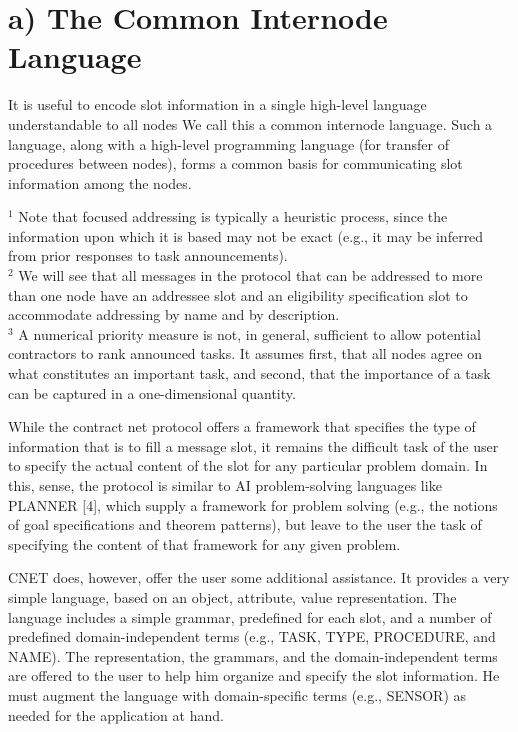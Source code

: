 \documentclass[
]{article}
\begin{document}
\section{a) The Common Internode
Language}\label{a-the-common-internode-language}

It is useful to encode slot information in a single high-level language
understandable to all nodes We call this a common internode language.
Such a language, along with a high-level programming language (for
transfer of procedures between nodes), forms a common basis for
communicating slot information among the nodes.

\(^{1}\) Note that focused addressing is typically a heuristic process,
since the information upon which it is based may not be exact (e.g., it
may be inferred from prior responses to task announcements).\\
\(^{2}\) We will see that all messages in the protocol that can be
addressed to more than one node have an addressee slot and an
eligibility specification slot to accommodate addressing by name and by
description.\\
\(^{3}\) A numerical priority measure is not, in general, sufficient to
allow potential contractors to rank announced tasks. It assumes first,
that all nodes agree on what constitutes an important task, and second,
that the importance of a task can be captured in a one-dimensional
quantity.

While the contract net protocol offers a framework that specifies the
type of information that is to fill a message slot, it remains the
difficult task of the user to specify the actual content of the slot for
any particular problem domain. In this, sense, the protocol is similar
to AI problem-solving languages like PLANNER {[}4{]}, which supply a
framework for problem solving (e.g., the notions of goal specifications
and theorem patterns), but leave to the user the task of specifying the
content of that framework for any given problem.

CNET does, however, offer the user some additional assistance. It
provides a very simple language, based on an object, attribute, value
representation. The language includes a simple grammar, predefined for
each slot, and a number of predefined domain-independent terms (e.g.,
TASK, TYPE, PROCEDURE, and NAME). The representation, the grammars, and
the domain-independent terms are offered to the user to help him
organize and specify the slot information. He must augment the language
with domain-specific terms (e.g., SENSOR) as needed for the application
at hand.
\end{document}
